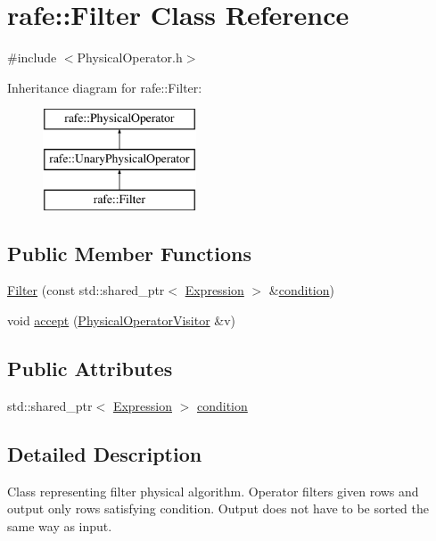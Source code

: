 \hypertarget{classrafe_1_1_filter}{\section{rafe\+:\+:Filter Class Reference}
\label{classrafe_1_1_filter}
}


{\ttfamily \#include $<$Physical\+Operator.\+h$>$}

Inheritance diagram for rafe\+:\+:Filter\+:\begin{figure}[H]
\begin{center}
\leavevmode
\includegraphics[height=3.000000cm]{classrafe_1_1_filter}
\end{center}
\end{figure}
\subsection*{Public Member Functions}
\begin{DoxyCompactItemize}
\item 
\hyperlink{classrafe_1_1_filter_af4f33192eef0626cf16fc9cb51b3e3de}{Filter} (const std\+::shared\+\_\+ptr$<$ \hyperlink{classrafe_1_1_expression}{Expression} $>$ \&\hyperlink{classrafe_1_1_filter_ac57844e611bd2d1951d1d4089135ddb9}{condition})
\item 
void \hyperlink{classrafe_1_1_filter_a27d15fd98afe3c03f05f5a4c5846b2a6}{accept} (\hyperlink{classrafe_1_1_physical_operator_visitor}{Physical\+Operator\+Visitor} \&v)
\end{DoxyCompactItemize}
\subsection*{Public Attributes}
\begin{DoxyCompactItemize}
\item 
std\+::shared\+\_\+ptr$<$ \hyperlink{classrafe_1_1_expression}{Expression} $>$ \hyperlink{classrafe_1_1_filter_ac57844e611bd2d1951d1d4089135ddb9}{condition}
\end{DoxyCompactItemize}


\subsection{Detailed Description}
Class representing filter physical algorithm. Operator filters given rows and output only rows satisfying condition. Output does not have to be sorted the same way as input. 

